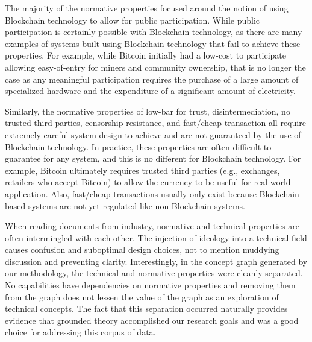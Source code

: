 The majority of the normative properties focused around the notion of using Blockchain technology to allow for public participation.
While public participation is certainly possible with Blockchain technology, as there are many examples of systems built using Blockchain technology that fail to achieve these properties.
For example, while Bitcoin initially had a low-cost to participate allowing easy-of-entry for miners and community ownership, that is no longer the case as any meaningful participation requires the purchase of a large amount of specialized hardware and the expenditure of a significant amount of electricity.

Similarly, the normative properties of low-bar for trust, disintermediation, no trusted third-parties, censorship resistance, and fast/cheap transaction all require extremely careful system design to achieve and are not guaranteed by the use of Blockchain technology.
In practice, these properties are often difficult to guarantee for any system, and this is no different for Blockchain technology.
For example, Bitcoin ultimately requires trusted third parties (e.g., exchanges, retailers who accept Bitcoin) to allow the currency to be useful for real-world application.
Also, fast/cheap transactions usually only exist because Blockchain based systems are not yet regulated like non-Blockchain systems.

When reading documents from industry, normative and technical properties are often intermingled with each other.
The injection of ideology into a technical field causes confusion and suboptimal design choices, not to mention muddying discussion and preventing clarity.
Interestingly, in the concept graph generated by our methodology, the technical and normative properties were cleanly separated.
No capabilities have dependencies on normative properties and removing them from the graph does not lessen the value of the graph as an exploration of technical concepts.
The fact that this separation occurred naturally provides evidence that grounded theory accomplished our research goals and was a good choice for addressing this corpus of data.


